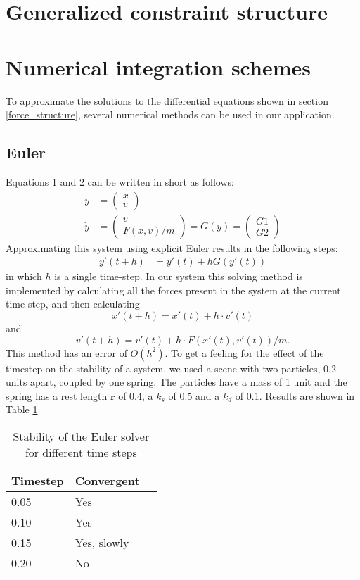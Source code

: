 \documentclass[a4paper,twoside,11pt,twocolumn]{article}
\begin{document}
\section{Generalized constraint structure}

\section{Numerical integration schemes}
\label{Numerical_schemes}
To approximate the solutions to the differential equations shown in section \ref{force_structure}, several numerical methods can be used in our application.
\subsection{Euler}
Equations 1 and 2 can be written in short as follows:
\begin{align}
	y &= \begin{pmatrix}x\\v\end{pmatrix}\\
	\dot{y} &= \begin{pmatrix}v\\F(x, v)/m\end{pmatrix} = G(y) = \begin{pmatrix}G1\\G2\end{pmatrix}
\end{align}
Approximating this system using explicit Euler results in the following steps:
\begin{align}
	y'(t+h) &= y'(t) + hG(y'(t))
\end{align}
in which $h$ is a single time-step. In our system this solving method is implemented by calculating all the forces present in the system at the current time step, and then calculating \[x'(t+h) = x'(t) + h\cdot v'(t)\] and \[v'(t+h) = v'(t) + h\cdot F(x'(t), v'(t))/m.\] This method has an error of $O(h^2)$. 
To get a feeling for the effect of the timestep on the stability of a system, we used a scene with two particles, 0.2 units apart, coupled by one spring. The particles have a mass of 1 unit and the spring has a rest length $\mathbf{r}$ of 0.4, a $k_s$ of 0.5 and a $k_d$ of 0.1. Results are shown in Table \ref{Euler}

\begin{table}[h]
	\caption{Stability of the Euler solver for different time steps}
	\label{Euler}
	\begin{tabular}{|l|l|l|}
		\hline
		\textbf{Timestep} & \textbf{Convergent} \\ \hline
		0.05              & Yes                 \\ \hline
		0.10              & Yes                 \\ \hline
		0.15              & Yes, slowly         \\ \hline
		0.20              & No                  \\ \hline
	\end{tabular}
\end{table}
\end{document}
